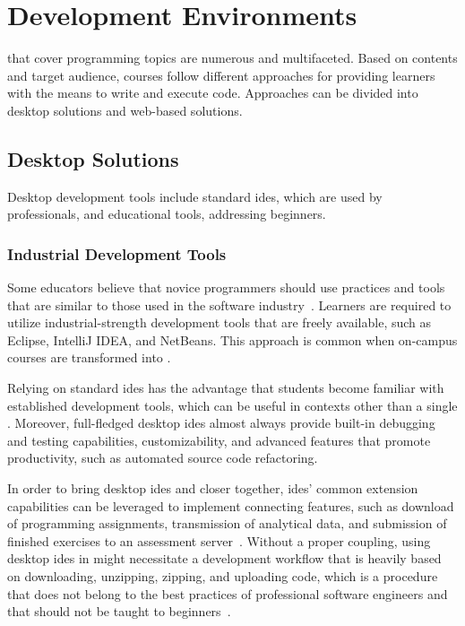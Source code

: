 \section{Development Environments}\label{section:development-environment1}

\moocs that cover programming topics are numerous and multifaceted. Based on contents and target audience, courses follow different approaches for providing learners with the means to write and execute code. Approaches can be divided into desktop solutions and web-based solutions.

\subsection{Desktop Solutions}

Desktop development tools include standard \glspl{ide}, which are used by professionals, and educational tools, addressing beginners.

\subsubsection{Industrial Development Tools}

Some \cs educators believe that novice programmers should use practices and tools that are similar to those used in the software industry~\cite{vihavainen2013scaffolding}. Learners are required to utilize industrial-strength development tools that are freely available, such as Eclipse, IntelliJ IDEA, and NetBeans. This approach is common when on-campus courses are transformed into \moocs.

Relying on standard \glspl{ide} has the advantage that students become familiar with established development tools, which can be useful in contexts other than a single \mooc. Moreover, full-fledged desktop \glspl{ide} almost always provide built-in debugging and testing capabilities, customizability, and advanced features that promote productivity, such as automated source code refactoring.

In order to bring desktop \glspl{ide} and \moocs closer together, \glspl{ide}' common extension capabilities can be leveraged to implement connecting features, such as download of programming assignments, transmission of analytical data, and submission of finished exercises to an assessment server~\cite{vihavainen2013scaffolding}. Without a proper coupling, using desktop \glspl{ide} in \moocs might necessitate a development workflow that is heavily based on downloading, unzipping, zipping, and uploading code, which is a procedure that does not belong to the best practices of professional software engineers and that should not be taught to beginners~\cite{vihavainen2013scaffolding}.

